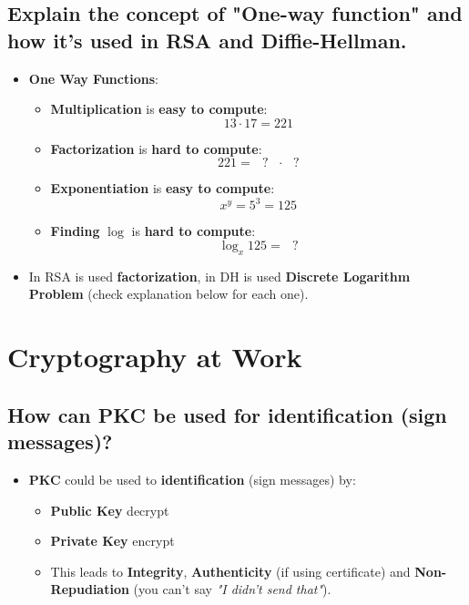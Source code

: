 \documentclass[9pt, letterpaper]{article}
\begin{document}
\subsection{Explain the concept of "One-way function" and how it's used in RSA and Diffie-Hellman.}
\begin{itemize}
	\item \textbf{One Way Functions}:
	      \begin{itemize}
		      \item \textbf{Multiplication} is \textbf{easy to compute}: $$ 13\cdot 17 = 221 $$
		      \item \textbf{Factorization} is \textbf{hard to compute}: $$ 221 = \mbox{  } ? \mbox{ }\cdot \mbox{ } ? $$
		      \item \textbf{Exponentiation} is \textbf{easy to compute}: $$ x^y = 5^3 = 125 $$
		      \item \textbf{Finding} $\log$ is \textbf{hard to compute}: $$ \log_x125 = \mbox{ } ? $$
	      \end{itemize}
	\item In RSA is used \textbf{factorization}, in \textsc{DH} is used \textbf{Discrete Logarithm Problem} (check explanation below for each one).
\end{itemize}

\newpage

\section{Cryptography at Work}

\subsection{How can PKC be used for identification (sign messages)?}
\begin{itemize}
	\item \textbf{PKC} could be used to \textbf{identification} (sign messages) by:
	      \begin{itemize}
		      \item \textbf{Public Key} decrypt
		      \item \textbf{Private Key} encrypt
		      \item This leads to \textbf{Integrity}, \textbf{Authenticity} (if using certificate) and \textbf{Non-Repudiation} (you can't say \textit{"I didn't send that"}).
	      \end{itemize}
\end{itemize}
\end{document}
